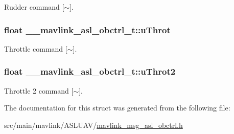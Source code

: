 Rudder command \mbox{[}$\sim$\mbox{]}. 

\hypertarget{struct____mavlink__asl__obctrl__t_a4ba7bded13997fedbe0c0d5577e9818d}{
\subsubsection[{u\+Throt}]{\setlength{\rightskip}{0pt plus 5cm}float \+\_\+\+\_\+mavlink\+\_\+asl\+\_\+obctrl\+\_\+t\+::u\+Throt}}\label{struct____mavlink__asl__obctrl__t_a4ba7bded13997fedbe0c0d5577e9818d}


Throttle command \mbox{[}$\sim$\mbox{]}. 

\hypertarget{struct____mavlink__asl__obctrl__t_a1f3327bb7b6b62c75ab82cf872563f87}{
\subsubsection[{u\+Throt2}]{\setlength{\rightskip}{0pt plus 5cm}float \+\_\+\+\_\+mavlink\+\_\+asl\+\_\+obctrl\+\_\+t\+::u\+Throt2}}\label{struct____mavlink__asl__obctrl__t_a1f3327bb7b6b62c75ab82cf872563f87}


Throttle 2 command \mbox{[}$\sim$\mbox{]}. 



The documentation for this struct was generated from the following file\+:\begin{DoxyCompactItemize}
\item 
src/main/mavlink/\+A\+S\+L\+U\+A\+V/\hyperlink{mavlink__msg__asl__obctrl_8h}{mavlink\+\_\+msg\+\_\+asl\+\_\+obctrl.\+h}\end{DoxyCompactItemize}
